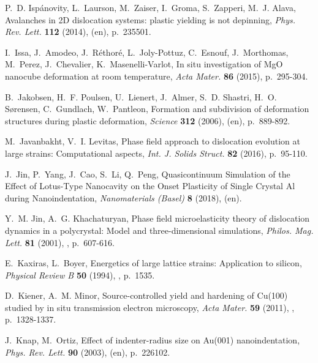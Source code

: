 \documentclass[CRPHYS,Unicode,manuscript]{cedram}
\begin{document}
\begin{thebibliography}{100}
P.~D. Isp{\'a}novity, L.~Laurson, M.~Zaiser, I.~Groma, S.~Zapperi, M.~J. Alava,
  {\og Avalanches in {2D} dislocation systems: plastic yielding is not
  depinning\fg}, \emph{Phys. Rev. Lett.} \textbf{112} (2014), 
  (en), p.~235501.

I.~Issa, J.~Amodeo, J.~R{\'e}thor{\'e}, L.~Joly-Pottuz, C.~Esnouf,
  J.~Morthomas, M.~Perez, J.~Chevalier, K.~Masenelli-Varlot, {\og In situ
  investigation of {MgO} nanocube deformation at room temperature\fg},
  \emph{Acta Mater.} \textbf{86} (2015), p.~295-304.

B.~Jakobsen, H.~F. Poulsen, U.~Lienert, J.~Almer, S.~D. Shastri, H.~O.
  S{\o}rensen, C.~Gundlach, W.~Pantleon, {\og Formation and subdivision of
  deformation structures during plastic deformation\fg}, \emph{Science}
  \textbf{312} (2006),  (en), p.~889-892.

M.~Javanbakht, V.~I. Levitas, {\og Phase field approach to dislocation
  evolution at large strains: Computational aspects\fg}, \emph{Int. J. Solids
  Struct.} \textbf{82} (2016), p.~95-110.

J.~Jin, P.~Yang, J.~Cao, S.~Li, Q.~Peng, {\og Quasicontinuum Simulation of the
  Effect of {Lotus-Type} Nanocavity on the Onset Plasticity of Single Crystal
  Al during Nanoindentation\fg}, \emph{Nanomaterials (Basel)} \textbf{8}
  (2018),  (en).

Y.~M. Jin, A.~G. Khachaturyan, {\og Phase field microelasticity theory of
  dislocation dynamics in a polycrystal: Model and three-dimensional
  simulations\fg}, \emph{Philos. Mag. Lett.} \textbf{81} (2001), ,
  p.~607-616.

E.~Kaxiras, L.~Boyer, {\og Energetics of large lattice strains: Application to
  silicon\fg}, \emph{Physical Review B} \textbf{50} (1994), ,
  p.~1535.

D.~Kiener, A.~M. Minor, {\og Source-controlled yield and hardening of Cu(100)
  studied by in situ transmission electron microscopy\fg}, \emph{Acta Mater.}
  \textbf{59} (2011), , p.~1328-1337.

J.~Knap, M.~Ortiz, {\og Effect of indenter-radius size on Au(001)
  nanoindentation\fg}, \emph{Phys. Rev. Lett.} \textbf{90} (2003),  (en), p.~226102.


\end{thebibliography}
\end{document}
